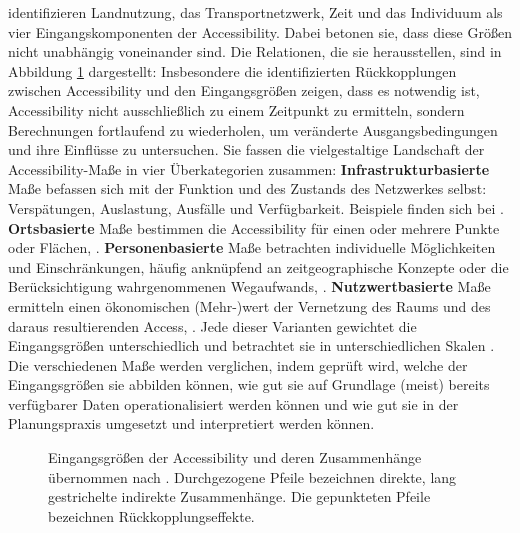 \documentclass[11pt,pdftex,a4paper]{scrartcl}
\begin{document}
	\textcite[128]{geursAccessibilityEvaluationLanduse2004} identifizieren Landnutzung, das Transportnetzwerk, Zeit und das Individuum als vier Eingangskomponenten der Accessibility. Dabei betonen sie, dass diese Größen nicht unabhängig voneinander sind. Die Relationen, die sie herausstellen, sind in Abbildung \ref{fig:geursaccessrelations} dargestellt: Insbesondere die identifizierten Rückkopplungen zwischen Accessibility und den Eingangsgrößen zeigen, dass es notwendig ist, Accessibility nicht ausschließlich zu einem Zeitpunkt zu ermitteln, sondern Berechnungen fortlaufend zu wiederholen, um veränderte Ausgangsbedingungen und ihre Einflüsse zu untersuchen. Sie fassen die vielgestaltige Landschaft der Accessibility-Maße in vier Überkategorien zusammen:
	\textbf{Infrastrukturbasierte} Maße befassen sich mit der Funktion und des Zustands des Netzwerkes selbst: Verspätungen, Auslastung, Ausfälle und Verfügbarkeit. Beispiele finden sich bei \parencites{chenAnalyzingUrbanBus2009}{goliszekUseGeneralTransit2016}{wesselConstructingRoutableRetrospective2017}{wesselDiscoveringSpaceTime2017}{prommaharajVisualizingPublicTransit2020}{liuGTFS2STNAnalyzingGTFS2025}.
	\textbf{Ortsbasierte} Maße bestimmen die Accessibility für einen oder mehrere Punkte oder Flächen, \parencites[u.a.][]{hansenHowAccessibilityShapes1959}{guyAssessmentAccessLocal1983}{cervigniSpatialAccessibilityPediatric2008}{farberTemporalVariabilityTransitbased2014}{boisjolyAccessibilityMeasurementsSao2020}{wuUrbanAccessGlobe2021}{jassochavezHowDoesSpatial2025}.
	\textbf{Personenbasierte} Maße betrachten individuelle Möglichkeiten und Einschränkungen, häufig anknüpfend an zeitgeographische Konzepte oder die Berücksichtigung wahrgenommenen Wegaufwands, \parencites[u.a.][]{kwanGenderIndividualAccess1999}{kwanIndividualAccessibilityRevisited2003}{neutensAnalysisDaytodayVariations2012}{chenMeasuringSpaceTime2016}{potPerceivedAccessibilityWhat2021}{mahmoudiNewMethodMeasuring2024}. \textbf{Nutzwertbasierte} Maße ermitteln einen ökonomischen (Mehr-)wert der Vernetzung des Raums und des daraus resultierenden Access, \parencites[u.a.][]{koenigIndicatorsUrbanAccessibility1980}{ziemkeAccessibilityPostApartheidCity2018}{guzmanHowMuchAccessibility2023}. Jede dieser Varianten gewichtet die Eingangsgrößen unterschiedlich und betrachtet sie in unterschiedlichen Skalen \parencite[vgl.][129f.]{geursAccessibilityEvaluationLanduse2004}. Die verschiedenen Maße werden verglichen, indem geprüft wird, welche der Eingangsgrößen sie abbilden können, wie gut sie auf Grundlage (meist) bereits verfügbarer Daten operationalisiert werden können und wie gut sie in der Planungspraxis umgesetzt und interpretiert werden können.
	\begin{figure}[!htb]
		
		\caption[Eingangsgrößen der Accessibility nach \textcite{geursAccessibilityEvaluationLanduse2004}]{Eingangsgrößen der Accessibility und deren Zusammenhänge übernommen nach \textcite{geursAccessibilityEvaluationLanduse2004}. Durchgezogene Pfeile bezeichnen direkte, lang gestrichelte indirekte Zusammenhänge. Die gepunkteten Pfeile bezeichnen Rückkopplungseffekte.}
		\label{fig:geursaccessrelations}
	\end{figure}
	
\end{document}
